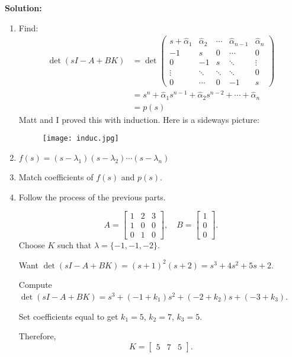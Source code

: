 \documentclass[12pt]{article}
\newenvironment{solution}{
    \textbf{Solution:}
    
}{
    
    \vspace{2em}
}
\begin{document}
\begin{solution}
    \begin{enumerate}[label=(\alph*)]
        \item Find:
        \[
            \begin{aligned}
                \det(sI - A + BK) &= \det\begin{pmatrix}
                    s + \hat{\alpha}_1 & \hat{\alpha}_2 & \cdots & \hat{\alpha}_{n-1} & \hat{\alpha}_n\\
                    -1 & s & 0 & \cdots & 0 \\
                    0 & -1 & s & \ddots & \vdots\\
                    \vdots & \ddots & \ddots & \ddots & 0\\
                    0 & \cdots & 0 & -1 & s
                \end{pmatrix}\\
                &= s^n + \hat{\alpha}_1 s^{n-1} + \hat{\alpha}_2 s^{n-2} + \cdots + \hat{\alpha}_n\\
                &= p(s)
            \end{aligned}
        \]
        Matt and I proved this with induction. Here is a sideways picture:
        \begin{figure}[H]
            \centering
            \texttt{[image: induc.jpg]}
        \end{figure}
        \item \(f(s) = (s - \lambda_1)(s - \lambda_2) \cdots (s - \lambda_n)\)
        \item Match coefficients of \(f(s)\) and \(p(s)\).
        \item Follow the process of the previous parts.
        
        \[
            A = \begin{bmatrix}
                1 & 2 & 3 \\
                1 & 0 & 0 \\
                0 & 1 & 0
            \end{bmatrix}, \quad
            B = \begin{bmatrix}
                1 \\
                0 \\
                0
            \end{bmatrix}.
        \]
        Choose \(K\) such that \(\lambda = \{-1, -1, -2\}\).

        Want \(\det(sI - A + BK) = (s + 1)^2(s + 2) = s^3 + 4s^2 + 5s + 2\).

        Compute \(\det(sI - A + BK) = s^3 + (-1 + k_1)s^2 + (-2 + k_2)s + (-3 + k_3)\).

        Set coefficients equal to get \(k_1 = 5\), \(k_2 = 7\), \(k_3 = 5\).
        
        Therefore,
        \[
            K = \begin{bmatrix}
                5 & 7 & 5
            \end{bmatrix}.
        \]
    \end{enumerate}
\end{solution}
\end{document}
